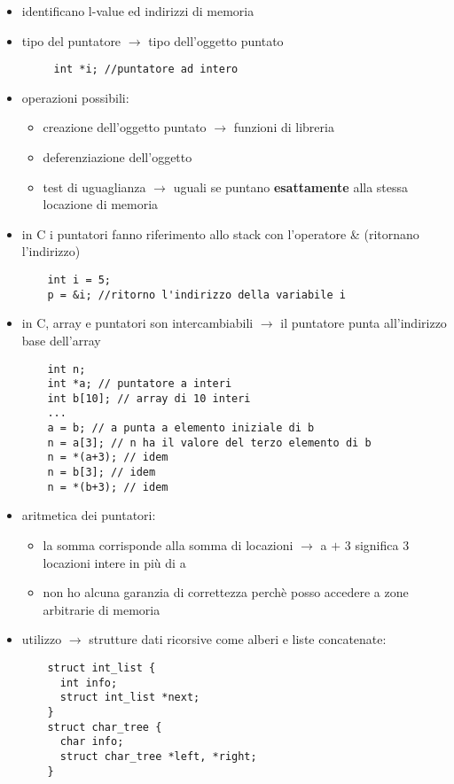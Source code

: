 \documentclass{article}
\begin{document}
\begin{flushleft}
\begin{itemize}
  \item identificano l-value ed indirizzi di memoria
  \item tipo del puntatore $\rightarrow$ tipo dell'oggetto puntato 
  \begin{lstlisting}
     int *i; //puntatore ad intero
  \end{lstlisting}
  \item operazioni possibili: 
  \begin{itemize}
    \item creazione dell'oggetto puntato $\rightarrow$ funzioni di libreria
    \item deferenziazione dell'oggetto
    \item test di uguaglianza $\rightarrow$ uguali se puntano \textbf{esattamente} alla stessa locazione di memoria
  \end{itemize}
  \item in C i puntatori fanno riferimento allo stack con l'operatore \& (ritornano l'indirizzo)
  \begin{lstlisting}
    int i = 5;
    p = &i; //ritorno l'indirizzo della variabile i
  \end{lstlisting}
  \item in C, array e puntatori son intercambiabili $\rightarrow$ il puntatore punta all'indirizzo base dell'array
  \begin{lstlisting}
    int n;
    int *a; // puntatore a interi
    int b[10]; // array di 10 interi
    ...
    a = b; // a punta a elemento iniziale di b
    n = a[3]; // n ha il valore del terzo elemento di b
    n = *(a+3); // idem
    n = b[3]; // idem
    n = *(b+3); // idem
  \end{lstlisting}
  \item aritmetica dei puntatori:
  \begin{itemize}
    \item la somma corrisponde alla somma di locazioni  $\rightarrow$  a $+$ 3 significa 3 locazioni intere in più di a
    \item non ho alcuna garanzia di correttezza perchè posso accedere a zone arbitrarie di memoria
  \end{itemize}
  
  \newpage
  
  \item utilizzo  $\rightarrow$  strutture dati ricorsive come alberi e liste concatenate:
  \begin{lstlisting}
    struct int_list {
      int info;
      struct int_list *next;
    }
    struct char_tree {     
      char info;
      struct char_tree *left, *right;
    }
  \end{lstlisting}


\end{itemize}
\end{flushleft}
\end{document}
